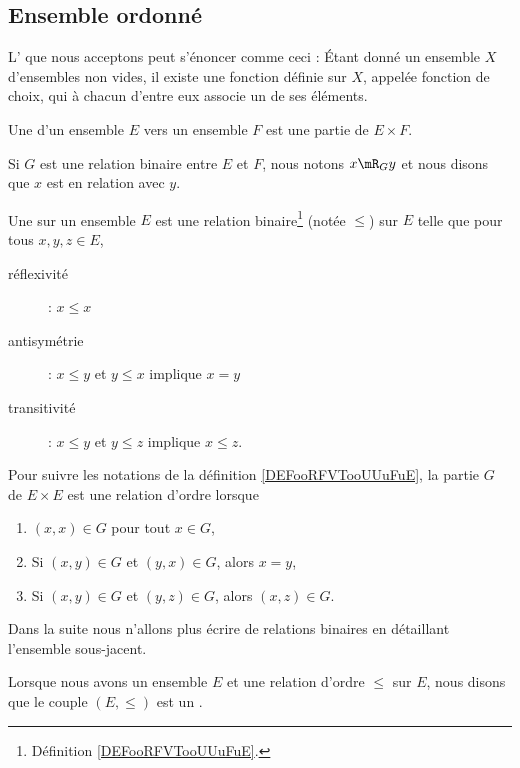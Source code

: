 \subsection{Ensemble ordonné}

\begin{normaltext}\label{NORooLMBYooYjUoju}
    L' que nous acceptons peut s'énoncer comme ceci\cite{ooKLIXooHbpufL} : Étant donné un ensemble $X$ d'ensembles non vides, il existe une fonction définie sur $X$, appelée fonction de choix, qui à chacun d'entre eux associe un de ses éléments.
\end{normaltext}

\begin{definition}        \label{DEFooRFVTooUUuFuE}
    Une  d'un ensemble $E$ vers un ensemble $F$ est une partie de \( E\times F\).

    Si \( G\) est une relation binaire entre \( E\) et \( F\), nous notons \( x\mR_G y\) et nous disons que \( x\) est en relation avec \( y\).
\end{definition}

\begin{definition}      \label{DefooFLYOooRaGYRk}
    Une  sur un ensemble \( E\) est une relation binaire\footnote{Définition \ref{DEFooRFVTooUUuFuE}.} (notée \( \leq\)) sur \( E\) telle que pour tous \( x,y,z\in E\),
    \begin{description}
        \item[réflexivité] : \( x\leq x\)
         \item[antisymétrie] : \( x\leq y\) et \( y\leq x\) implique \( x=y\)
         \item[transitivité] : \( x\leq y\) et \( y\leq z\) implique \( x\leq z\).
    \end{description}

    Pour suivre les notations de la définition \ref{DEFooRFVTooUUuFuE}, la partie \( G\) de \( E\times E\) est une relation d'ordre lorsque
    \begin{enumerate}
        \item
            \( (x,x)\in G\) pour tout \( x\in G\),
        \item
            Si \( (x,y)\in G\) et \( (y,x)\in G\), alors \( x=y\),
        \item
            Si \( (x,y)\in G\) et \( (y,z)\in G\), alors \( (x,z)\in G\).
    \end{enumerate}
    Dans la suite nous n'allons plus écrire de relations binaires en détaillant l'ensemble sous-jacent.

    Lorsque nous avons un ensemble \( E\) et une relation d'ordre \( \leq\) sur \( E\), nous disons que le couple \( (E,\leq)\) est un .
\end{definition}

